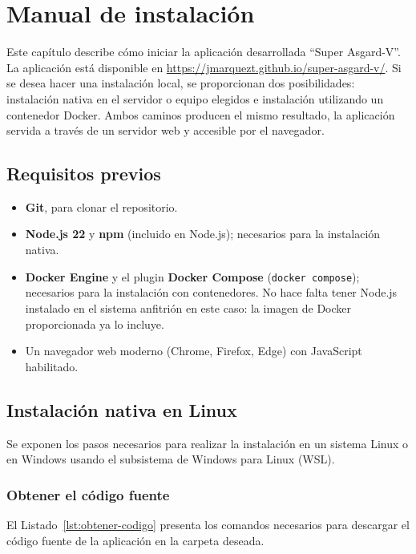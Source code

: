 \documentclass[../main.tex]{subfiles}
\begin{document}
\chapter{Manual de instalación}
\label{C:instalacion}
\lstset{style=asgardstyle, gobble=1}

Este capítulo describe cómo iniciar la aplicación desarrollada ``Super Asgard-V''. La aplicación está disponible en \url{https://jmarquezt.github.io/super-asgard-v/}. Si se desea hacer una instalación local, se proporcionan dos posibilidades: instalación nativa en el servidor o equipo elegidos e instalación utilizando un contenedor Docker. Ambos caminos producen el mismo resultado, la aplicación servida a través de un servidor web y accesible por el navegador.

\section{Requisitos previos}

\begin{itemize}
	\item \textbf{Git}, para clonar el repositorio.
	\item \textbf{Node.js 22} y \textbf{npm} (incluido en Node.js); necesarios para la instalación nativa.
	\item \textbf{Docker Engine} y el plugin \textbf{Docker Compose} (\texttt{docker compose}); necesarios para la instalación con contenedores. No hace falta tener Node.js instalado en el sistema anfitrión en este caso: la imagen de Docker proporcionada ya lo incluye.
	\item Un navegador web moderno (Chrome, Firefox, Edge) con JavaScript habilitado.
\end{itemize}

\section{Instalación nativa en Linux}

Se exponen los pasos necesarios para realizar la instalación en un sistema Linux o en Windows usando el subsistema de Windows para Linux (WSL).

\subsection{Obtener el código fuente}

El Listado~\ref{lst:obtener-codigo} presenta los comandos necesarios para descargar el código fuente de la aplicación en la carpeta deseada.
\end{document}
